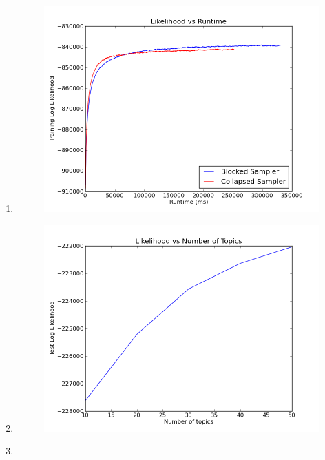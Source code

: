 \documentclass[11pt,a4paper]{article}
\begin{document}
\begin{enumerate}
		\item
			\begin{figure}[h]
				\begin{center}
					\includegraphics[scale=0.5]{../runtime_plot}
				\end{center}
			\end{figure}
		\item
			\begin{figure}[h]
				\begin{center}
					\includegraphics[scale=0.5]{../topics_plot}
				\end{center}
			\end{figure}
		\item
			\begin{figure}[h]

\end{figure}
\end{enumerate}
\end{document}
